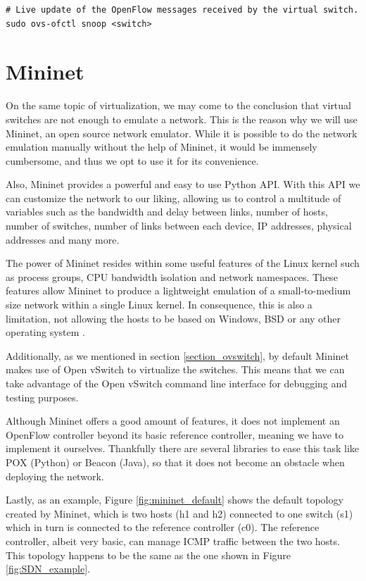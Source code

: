 \begin{lstlisting}
# Live update of the OpenFlow messages received by the virtual switch.
sudo ovs-ofctl snoop <switch>
\end{lstlisting}

\section{Mininet} \label{Mininet}
On the same topic of virtualization, we may come to the conclusion that virtual switches are not enough to emulate a network. This is the reason why we will use Mininet\cite{mininet_website}, an open source network emulator. While it is possible to do the network emulation manually without the help of Mininet, it would be immensely cumbersome, and thus we opt to use it for its convenience. 

Also, Mininet provides a powerful and easy to use Python API. With this API we can customize the network to our liking, allowing us to control a multitude of variables such as the bandwidth and delay between links, number of hosts, number of switches, number of links between each device, IP addresses, physical addresses and many more.

The power of Mininet resides within some useful features of the Linux kernel such as process groups, CPU bandwidth isolation and network namespaces. These features allow Mininet to produce a lightweight emulation of a small-to-medium size network within a single Linux kernel. In consequence, this is also a limitation, not allowing the hosts to be based on Windows, BSD or any other operating system \cite{mininet}.

Additionally, as we mentioned in section \ref{section_ovswitch}, by default Mininet makes use of Open vSwitch to virtualize the switches. This means that we can take advantage of the Open vSwitch command line interface for debugging and testing purposes.

Although Mininet offers a good amount of features, it does not implement an OpenFlow controller beyond its basic reference controller, meaning we have to implement it ourselves. Thankfully there are several libraries to ease this task like POX (Python) or Beacon (Java), so that it does not become an obstacle when deploying the network.

Lastly, as an example, Figure \ref{fig:mininet_default} shows the default topology created by Mininet, which is two hosts (h1 and h2) connected to one switch (s1) which in turn is connected to the reference controller (c0). The reference controller, albeit very basic, can manage ICMP traffic between the two hosts. This topology happens to be the same as the one shown in Figure \ref{fig:SDN_example}.

